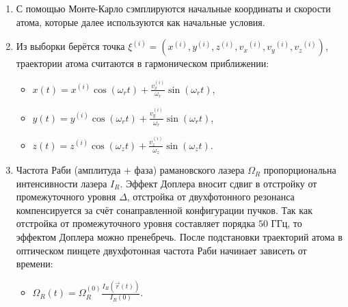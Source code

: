 \begin{enumerate}
	\item С помощью Монте-Карло сэмплируются начальные координаты и скорости атома, которые далее используются как начальные условия.

	\item Из выборки берётся точка $\xi^{(i)} = \left(x^{\left(i\right)},y^{\left(i\right)},z^{\left(i\right)},{v_x}^{\left(i\right)},{v_y}^{\left(i\right)},{v_z}^{\left(i\right)}\right)$, траектории атома считаются в гармоническом приближении:

	\begin{itemize}
		\item $x\left(t\right)=x^{\left(i\right)}\cos{\left(\omega_rt\right)}+\frac{v_x^{\left(i\right)}}{\omega_r}\sin{\left(\omega_rt\right)}$,

		\item $y\left(t\right)=y^{\left(i\right)}\cos{\left(\omega_rt\right)}+\frac{v_y^{\left(i\right)}}{\omega_r}\sin{\left(\omega_rt\right)}$,

		\item $z\left(t\right)=z^{\left(i\right)}\cos{\left(\omega_zt\right)}+\frac{v_z^{\left(i\right)}}{\omega_z}\sin{\left(\omega_zt\right)}$.
	\end{itemize}

	\item Частота Раби (амплитуда + фаза) рамановского лазера $\Omega_{R}$ пропорциональна интенсивности лазера $I_{R}$. Эффект Доплера вносит сдвиг в отстройку от промежуточного уровня $\Delta$, отстройка от двухфотонного резонанса компенсируется за счёт сонаправленной конфигурации пучков. Так как отстройка от промежуточного уровня составляет порядка $50 \text{ ГГц}$, то эффектом Доплера можно пренебречь. После подстановки траекторий атома в оптическом пинцете двухфотонная частота Раби начинает зависеть от времени:

	\begin{itemize}
		\item $\Omega_{R}(t) = \Omega_{R}^{(0)} \frac{I_{R}(\vec{r}(t))}{I_{R}(0)}$. 
	\end{itemize}	
\end{enumerate}
	
